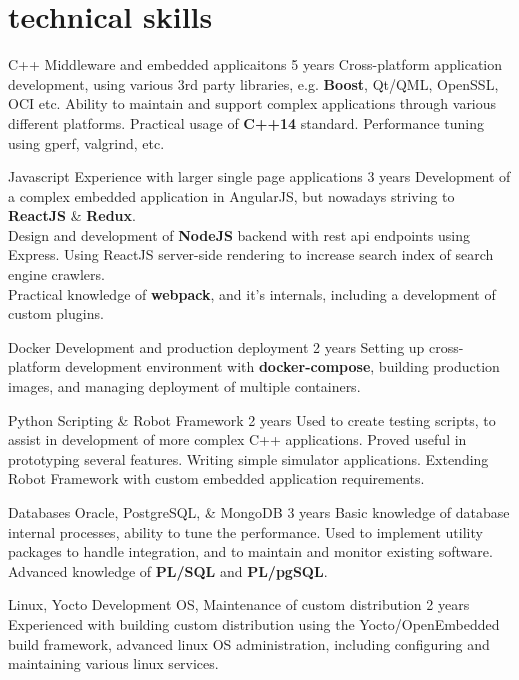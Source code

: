 \documentclass[]{friggeri-cv} %
\begin{document}

\section{technical skills}
\begin{entrylist}
\entry
{C++}
{Middleware and embedded applicaitons}
{5 years}
{Cross-platform application development, using various 3rd party libraries, e.g. \textbf{Boost}, Qt/QML, OpenSSL, OCI etc. Ability to maintain and support complex applications through various different platforms. Practical usage of \textbf{C++14} standard. Performance tuning using gperf, valgrind, etc.}

\entry
{Javascript}
{Experience with larger single page applications}
{3 years}
{Development of a complex embedded application in AngularJS, but nowadays striving to \textbf{ReactJS} \& \textbf{Redux}.
\\
Design and development of \textbf{NodeJS} backend with rest api endpoints using Express. Using ReactJS server-side rendering to increase search index of search engine crawlers.
\\
Practical knowledge of \textbf{webpack}, and it's internals, including a development of custom plugins.}

\entry
{Docker}
{Development and production deployment}
{2 years}
{Setting up cross-platform development environment with \textbf{docker-compose}, building production images, and managing deployment of multiple containers.}

\entry
{Python}
{Scripting \& Robot Framework}
{2 years}
{Used to create testing scripts, to assist in development of more complex C++ applications. Proved useful in prototyping several features. Writing simple simulator applications. Extending Robot Framework with custom embedded application requirements.}

\entry
{Databases}
{Oracle, PostgreSQL, \& MongoDB}
{3 years}
{Basic knowledge of database internal processes, ability to tune the performance. Used to implement utility packages to handle integration, and to maintain and monitor existing software. Advanced knowledge of \textbf{PL/SQL} and \textbf{PL/pgSQL}.}

\entry
{Linux, Yocto}
{Development OS, Maintenance of custom distribution}
{2 years}
{Experienced with building custom distribution using the Yocto/OpenEmbedded build framework,
advanced linux OS administration, including configuring and maintaining various linux services.}

\end{entrylist}
\end{document}
